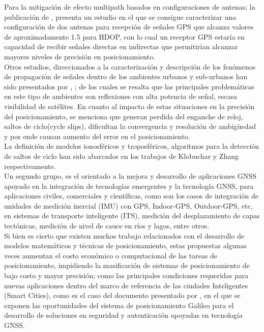 Para la mitigación de efecto multipath basados en configuraciones de antenas; la publicación de \cite{AlJewari}, presenta un estudio en el que se consigue caracterizar una configuración de dos antenas para recepción de señales GPS que alcanza valores de aproximadamente 1.5 para HDOP, con lo cual un receptor GPS estaría en capacidad de recibir señales directas en indirectas que permitirían alcanzar mayores niveles de precisión en posicionamiento.\\

Otros estudios, direccionados a la caracterización y descripción de los fenómenos de propagación de señales dentro de los ambientes urbanos y sub-urbanos han sido presentados por \cite{lehner2005novel}, \cite{steingass2008differences}; de los cuales se resalta que las principales problemáticas en este tipo de ambientes son reflexiones con alta potencia de señal, escasa visibilidad de satélites.%
En cuanto al impacto de estas situaciones en la precisión del posicionamiento, se menciona que generan perdida del enganche de reloj, saltos de ciclo(cycle slips), dificultan la convergencia y resolución de ambigüedad y por ende causan aumento del error en el posicionamiento. \\

La definición de modelos ionosféricos y troposféricos, algoritmos para la detección de saltos de ciclo han sido abarcados en los trabajos de Klobuchar \cite{Klobuchar_1987} y Zhang\cite{Zhang_2006} respectivamente.\\

Un segundo grupo, es el orientado a la mejora y desarrollo de aplicaciones GNSS apoyado en la integración de tecnologías emergentes y la tecnología GNSS, para aplicaciones civiles, comerciales y científicas, como son los casos de integración de unidades de medición inercial (IMU) con GPS, Indoor-GPS, Outdoor-GPS, etc, en sistemas de transporte inteligente (ITS), medición del desplazamiento de capas tectónicas, medición de nivel de cauce en ríos y lagos, entre otros.\\

Si bien es cierto que existen muchos trabajo relacionados con el desarrollo de modelos matemáticos y técnicas de posicionamiento, estas propuestas algunas veces aumentan el costo económico o computacional de las tareas de posicionamiento, impidiendo la masificación de sistemas de posicionamiento de bajo costo y mayor precisión; como las principales condiciones requeridas para nuevas aplicaciones dentro del marco de referencia de las ciudades Inteligentes (Smart Cities), como es el caso del documento presentado por \cite{barreca2010future}, en el que se exponen las oportunidades del sistema de posicionamiento Galileo para el desarrollo de soluciones en seguridad y autenticación apoyadas en tecnología GNSS.\\

